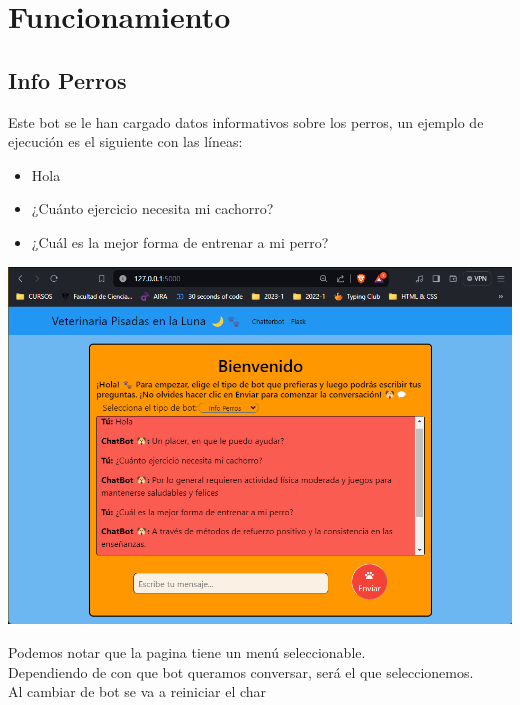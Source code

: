 \section{Funcionamiento}

\subsection{Info Perros}

Este bot se le han cargado datos informativos sobre los perros, un ejemplo 
de ejecución es el siguiente con las líneas:

\begin{itemize}
    \item Hola
    \item ¿Cuánto ejercicio necesita mi cachorro?
    \item ¿Cuál es la mejor forma de entrenar a mi perro?    
\end{itemize}

\begin{center}
    \includegraphics[scale = .5]{IMA/infoPerro.png}
\end{center}

\begin{center}
    Podemos notar que la pagina tiene un menú seleccionable.\\

    Dependiendo de con que bot queramos conversar, será el que seleccionemos.\\

    Al cambiar de bot se va a reiniciar el char    
\end{center}

